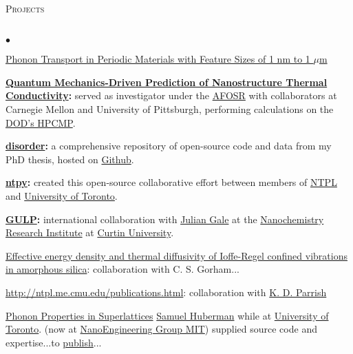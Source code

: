 \documentclass{article}
\newcommand{\lineunder}{\vspace*{-8pt} \\ \hspace*{-18pt} \hrulefill \\}
\newcommand{\header}[1]{{\hspace*{-15pt}\vspace*{6pt} \textsc{#1}} \vspace*{-6pt} \lineunder}
\newenvironment{achievements}{\begin{list}{$\bullet$}{\topsep 0pt \itemsep -2pt}}{\vspace*{4pt}\end{list}}
\begin{document}
\header{Projects}
\begin{achievements} 

\item \href{http://blogs.ubc.ca/amerimech2014/files/2014/04/ameritech_mcgaughey_apr14.pdf}{Phonon Transport in Periodic Materials with Feature Sizes of 1 nm to 1 $\mu$m}

\item \textbf{\href{http://ntpl.me.cmu.edu/research.html}{Quantum Mechanics-Driven Prediction of Nanostructure Thermal Conductivity}:}
served as investigator under the 
\href{http://www.wpafb.af.mil/afrl/afosr/}{AFOSR} with collaborators at Carnegie Mellon and University of Pittsburgh, performing 
calculations on the \href{http://www.hpcmo.hpc.mil/cms2/index.php}{DOD's HPCMP}.

\item \textbf{\href{https://github.com/jasonlarkin/disorder}{disorder}:} a comprehensive repository of open-source code and data from my PhD thesis, hosted on \href{http://github.com/jasonlarkin}{Github}.

\item \textbf{\href{https://github.com/ntpl/ntpy}{ntpy}:} created this open-source  collaborative effort between members of \href{http://ntpl.me.cmu.edu/}{NTPL} and \href{http://www.mie.utoronto.ca/labs/atoms/}{University of Toronto}.

\item \textbf{\href{https://nanochemistry.curtin.edu.au/local/docs/gulp/gulp4.2_manual.pdf}{GULP}:} international collaboration with \href{http://nanochemistry.curtin.edu.au/people/staff.cfm/J.Gale}{Julian Gale} at the 
\href{http://nanochemistry.curtin.edu.au/}{Nanochemistry Research Institute} at \href{http://www.curtin.edu.au/}{Curtin University}.

\item \href{http://www.andrew.cmu.edu/user/caroling/publications.html}{Effective energy density and thermal diffusivity of Ioffe-Regel confined vibrations in amorphous silica}: collaboration with C. S. Gorham...

\item \href{Origins of thermal conductivity changes in strained crystals}{http://ntpl.me.cmu.edu/publications.html}: collaboration with \href{http://www.kdparrish.com/}{K. D. Parrish}

\item \href{https://tspace.library.utoronto.ca/bitstream/1807/42871/1/Huberman_Samuel_C_201311_MASc_thesis.pdf}{Phonon Properties in Superlattices}
\href{http://web.mit.edu/schuberm/www/}{Samuel Huberman} while at \href{http://www.mie.utoronto.ca/labs/atoms/}{University of Toronto}. (now at \href{http://web.mit.edu/nanoengineering/people/students.shtml}{NanoEngineering Group MIT}) supplied source code and expertise...to \href{http://jasonlarkin.org/pub.html}{publish}... 


\end{achievements}
\end{document}
